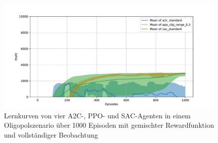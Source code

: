 \begin{figure}[htb]
	\centering
	\includegraphics[width=\textwidth]{appendix/comparison_oligopoly_mixed.pdf}
	\caption{Lernkurven von vier A2C-, PPO- und SAC-Agenten in einem Oligopolszenario über 1000 Episoden mit gemischter Rewardfunktion und vollständiger Beobachtung}
	\label{graphic:OligopolyMixedComparison}
\end{figure}